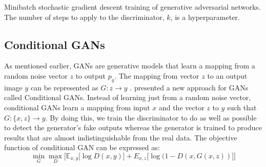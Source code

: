 \documentclass[oneside,a4paper,12pt]{report}
\begin{document}
\SetAlgoNoLine%
\begin{algorithm}[!htb]
 \caption{Minibatch stochastic gradient descent training of generative adversarial networks. The number of steps to apply to the discriminator, $k$, is a hyperparameter.}
\end{algorithm}

\subsection{Conditional GANs}
\hspace*{0.25 in}As mentioned earlier, GANs are generative models that learn a mapping from a random noise vector $z$ to output $p_g$. The mapping from vector $z$ to an output image $y$ can be represented as $G: z \rightarrow y$ \citep{goodfellow2014generative}. \cite{isola2018imagetoimage} presented a new approach for GANs called Conditional GANs. Instead of learning just from a random noise vector, conditional GANs learn a mapping from input $x$ and the vector $z$ to $y$ such that $G: \{x,z\} \rightarrow y$. By doing this, we train the discriminator to do as well as possible to detect the generator's fake outputs whereas the generator is trained to produce results that are almost indistinguishable from the real data. The objective function of conditional GAN can be expressed as:
$$
		\min_{G}\max_{D}\Big[\mathbb{E}_{x,y}\big[ \log D(x,y)\big] + E_{x,z}\big[ \log(1 - D(x, G(x,z))\big]\Big]
$$
\end{document}
